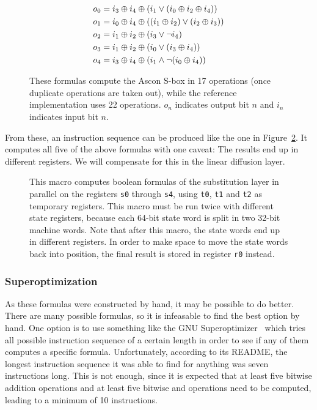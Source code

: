 \begin{figure}
\begin{align*}
   o_0 & = i_3 \oplus i_4 \oplus (i_1 \vee (i_0 \oplus i_2 \oplus i_4))
\\ o_1 & = i_0 \oplus i_4 \oplus ((i_1 \oplus i_2) \vee (i_2 \oplus i_3))
\\ o_2 & = i_1 \oplus i_2 \oplus (i_3 \vee \neg i_4)
\\ o_3 & = i_1 \oplus i_2 \oplus (i_0 \vee (i_3 \oplus i_4))
\\ o_4 & = i_3 \oplus i_4 \oplus (i_1 \wedge \neg (i_0 \oplus i_4))
\end{align*}

\caption{These formulas compute the Ascon S-box in 17 operations (once duplicate
operations are taken out), while the reference implementation uses 22
operations. $o_n$ indicates output bit $n$ and $i_n$ indicates input bit $n$.}

\label{shortformulas}
\end{figure}

From these, an instruction sequence can be produced like the one in
Figure~\ref{substitution}. It computes all five of the above formulas with one
caveat: The results end up in different registers. We will compensate
for this in the linear diffusion layer.

\begin{figure}[p]


\caption{This macro computes boolean formulas of the substitution layer in
parallel on the registers \texttt{s0} through \texttt{s4}, using \texttt{t0},
\texttt{t1} and \texttt{t2} as temporary registers. This macro must be run
twice with different state registers, because each 64-bit state word is split in
two 32-bit machine words. Note that after this macro, the state words end up
in different registers. In order to make space to move the state words back into
position, the final result is stored in register \texttt{r0} instead.}

\label{substitution}
\end{figure}

\subsubsection{Superoptimization}

As these formulas were constructed by hand, it may be possible to do better.
There are many possible formulas, so it is infeasable to find the best option by
hand. One option is to use something like the GNU
Superoptimizer~\cite{superoptimizer} which tries all possible instruction
sequence of a certain length in order to see if any of them computes a specific
formula. Unfortunately, according to its README, the longest instruction
sequence it was able to find for anything was seven instructions long. This is
not enough, since it is expected that at least five bitwise addition operations
and at least five bitwise and operations need to be computed, leading to a
minimum of 10 instructions.

